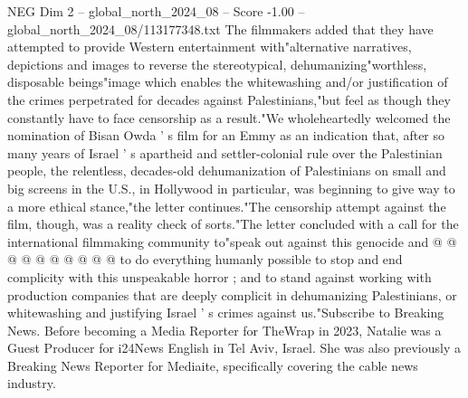 \begin{textsample}{NEG Dim 2 – global\_north\_2024\_08 – Score -1.00 – global\_north\_2024\_08/113177348.txt}
The filmmakers added that they have attempted to provide Western entertainment with"alternative narratives, depictions and images to reverse the stereotypical, dehumanizing"worthless, disposable beings"image which enables the whitewashing and/or justification of the crimes perpetrated for decades against Palestinians,"but feel as though they constantly have to face censorship as a result."We wholeheartedly welcomed the nomination of Bisan Owda ' s film for an Emmy as an indication that, after so many years of Israel ' s apartheid and settler-colonial rule over the Palestinian people, the relentless, decades-old dehumanization of Palestinians on small and big screens in the U.S., in Hollywood in particular, was beginning to give way to a more ethical stance,"the letter continues."The censorship attempt against the film, though, was a reality check of sorts."The letter concluded with a call for the international filmmaking community to"speak out against this genocide and @ @ @ @ @ @ @ @ @ @ to do everything humanly possible to stop and end complicity with this unspeakable horror ; and to stand against working with production companies that are deeply complicit in dehumanizing Palestinians, or whitewashing and justifying Israel ' s crimes against us."Subscribe to Breaking News.
Before becoming a Media Reporter for TheWrap in 2023, Natalie was a Guest Producer for i24News English in Tel Aviv, Israel.
She was also previously a Breaking News Reporter for Mediaite, specifically covering the cable news industry.

\end{textsample}
